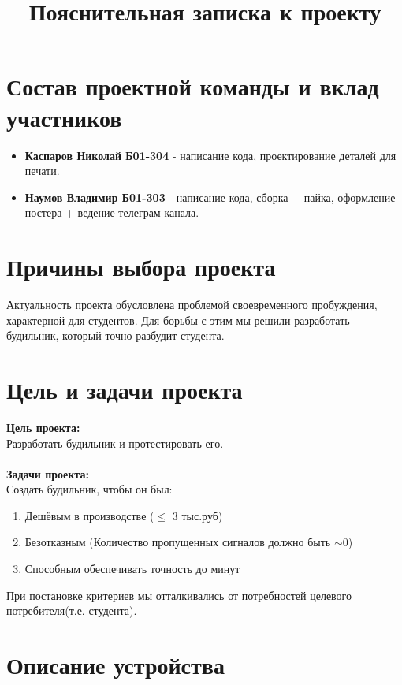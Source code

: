 \documentclass[12pt,a4paper]{article}
\title{Пояснительная записка к проекту}
\date{}
\begin{document}
\maketitle

\section{Состав проектной команды и вклад участников}

\begin{itemize}
    \item \textbf{Каспаров Николай Б01-304} - написание кода, проектирование деталей для печати.
    \item \textbf{Наумов Владимир Б01-303} - написание кода, сборка + пайка, оформление постера + ведение телеграм канала.
\end{itemize}

\section{Причины выбора проекта}

Актуальность проекта обусловлена проблемой своевременного пробуждения, характерной для студентов. Для борьбы с этим мы решили разработать будильник, который точно разбудит студента.

\section{Цель и задачи проекта}

\textbf{Цель проекта:} \\
Разработать будильник и протестировать его.
\\ \\
\textbf{Задачи проекта:}
\\
Создать будильник, чтобы он был:
\begin{enumerate}
    \item Дешёвым в производстве ($\leqslant$ 3 тыс.руб)
    \item Безотказным (Количество пропущенных сигналов должно быть $\sim$0)
    \item Способным обеспечивать точность до минут
\end{enumerate}
При постановке критериев мы отталкивались от потребностей целевого потребителя(т.е. студента).

\section{Описание устройства}
\end{document}
